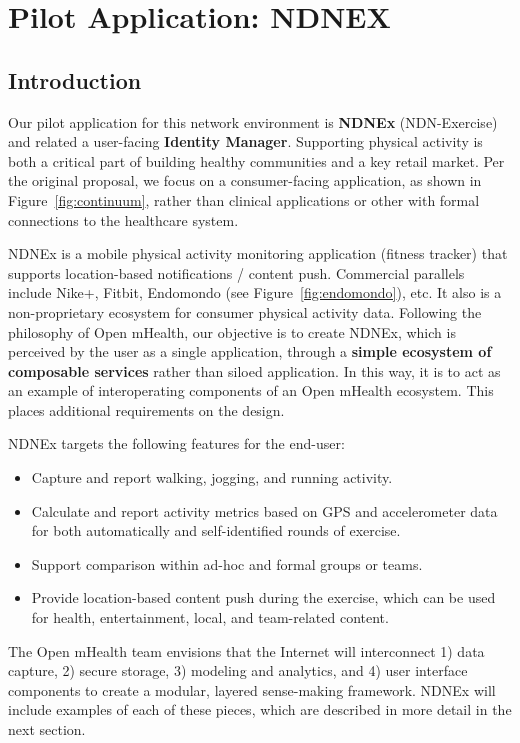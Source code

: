 \section{Pilot Application: NDNEX}

\subsection{Introduction}

Our pilot application for this network environment is \textbf{NDNEx} (NDN-Exercise) and related a user-facing \textbf{Identity Manager}.  Supporting physical activity is both a critical part of building healthy communities and a key retail market. Per the original proposal, we focus on a consumer-facing application, as shown in Figure~\ref{fig:continuum}, rather than clinical applications or other with formal connections to the healthcare system. 

NDNEx is a mobile physical activity monitoring application (fitness tracker) that supports location-based notifications / content push. Commercial parallels include  Nike+, Fitbit, Endomondo (see Figure~\ref{fig:endomondo}), etc. It also is a non-proprietary ecosystem for consumer physical activity data. Following the philosophy of Open mHealth, our objective is to create NDNEx, which is perceived by the user as a single application, through  a \textbf{simple ecosystem of composable services} rather than siloed application. In this way, it is to act as an example of interoperating components of an Open mHealth ecosystem.  This places additional requirements on the design. 

NDNEx targets  the following features for the end-user:
\begin{itemize}
\item Capture and report walking, jogging, and running activity. 
\item Calculate and report activity metrics based on GPS and accelerometer data for both automatically and self-identified rounds of exercise.  
\item Support comparison within ad-hoc and formal groups or teams. 
\item Provide location-based content push during the exercise, which can be used for health, entertainment, local, and team-related content. 
\end{itemize}

The Open mHealth team envisions that the Internet will interconnect 1)
data capture, 2) secure storage, 3) modeling and analytics, and 4) user
interface components to create a modular, layered sense-making framework.
NDNEx will include examples of each of these pieces, which are described in
more detail in the next section.

